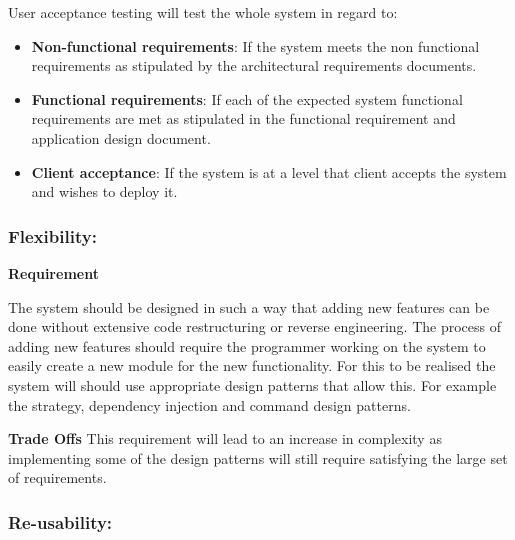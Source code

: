 \begin{flushleft}
\begin{itemize}
\end{itemize}

User acceptance testing will test the whole system in regard to:
\begin{itemize}

\item\textbf{Non-functional requirements}: If the system meets the non functional requirements as stipulated by the architectural requirements documents.
\item\textbf{Functional requirements}: If each of the expected system functional requirements are met as stipulated in the functional requirement and application design document.
\item\textbf{Client acceptance}: If the system is at a level that client accepts the system and wishes to deploy it.

\end{itemize}

\end{flushleft}

\newpage
\subsubsection{Flexibility:}

\begin{flushleft}
\vspace{0.1in}

\textbf{Requirement}

The system should be designed in such a way that adding new features can be done without extensive code restructuring or reverse engineering. The process of adding new features should require the programmer working on the system to easily create a new module for the new functionality. For this to be realised the system will should use appropriate design patterns that allow this. For example the strategy, dependency injection and command design patterns. 
\vspace{0.1in}

\textbf{Trade Offs}
This requirement will lead to an increase in complexity as implementing some of the design patterns will still require satisfying the large set of requirements.

\vspace{0.1in}

\end{flushleft}


\subsubsection{Re-usability:}

